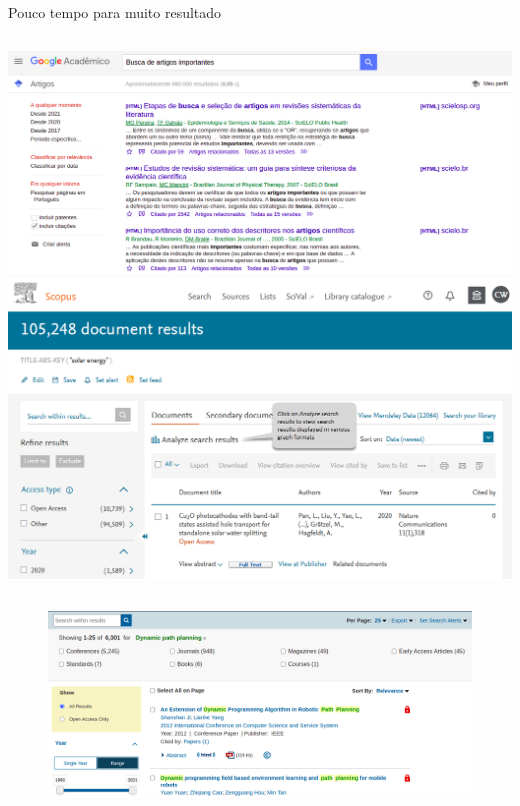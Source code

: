 \begin{frame}{Pouco tempo para muito resultado}
	\centering
	\begin{columns}
				\includegraphics[width=1\textwidth]{figures/googleacademico2.png}
				\includegraphics[width=1\textwidth]{figures/scopus.png}
	\end{columns}
	\begin{figure}
		\includegraphics[width=.6\textwidth]{figures/ieee.png}	
	\end{figure}
\end{frame}

